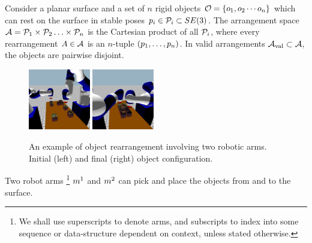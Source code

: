 Consider a planar surface and a set of $n$ rigid objects $ \mathcal{O}=\{ o_1, o_2 \cdots o_n\}$  which can rest on the surface in stable poses $p_i \in \mathcal{P}_i \subset SE(3)$. The arrangement space $ \mathcal{A} = \mathcal{P}_1 \times \mathcal{P}_2 \ldots \times \mathcal{P}_n $ is the Cartesian product of all $\mathcal{P}_i$, where every rearrangement $A \in \mathcal{A}$ is an $n$-tuple $(p_1, \ldots, p_n)$. In valid arrangements $ \mathcal{A}_{\rm val} \subset \mathcal{A}$, the objects are pairwise disjoint.


\begin{figure}[h]
	\centering
	\includegraphics[width=0.24\textwidth,trim={10cm 3cm 8cm 12cm},clip]{figures/rearrangement_start}
	\includegraphics[width=0.24\textwidth,trim={10cm 3cm 8cm 12cm},clip]{figures/rearrangement_end}
	\caption{An example of object rearrangement involving two robotic arms. Initial (left) and final (right) object configuration.}
	\label{fig:rearrangement}
\end{figure}
Two robot arms \footnote{We shall use superscripts to denote arms, and subscripts to index into some sequence or data-structure dependent on context, unless stated otherwise.} $m^1$ and $m^2$ can 
pick and place the objects from and to the surface.
